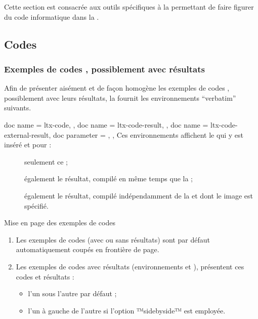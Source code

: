 \documentclass{letgut}
\begin{document}
Cette section est consacrée aux outils spécifiques à la  permettant
de faire figurer du code informatique dans la .

\subsection{Codes }
\label{sec:exemples-de-codes}

\subsubsection{Exemples de codes , possiblement avec résultats}
\label{sec:listings-}

Afin de présenter aisément et de façon homogène les exemples de codes
, possiblement avec leurs résultats, la  fournit les
environnements \enquote{verbatim} suivants.

\begin{docEnvironments}[
  doc parameter = \oarg{options},
  doclang/environment content = code,
  ]{
    {
      doc name = ltx-code,
    },
    {
      doc name = ltx-code-result,
    },
    {
      doc name = ltx-code-external-result,
      doc parameter = ,
    },
  }
  Ces environnements affichent le   qui y est inséré et
  pour :
  \begin{description}
  \item[] seulement ce  ;
  \item[] également le résultat, compilé en même temps
    que la  ;
  \item[] également le résultat, compilé
    indépendamment de la  et dont le  image est spécifié.
  \end{description}
\end{docEnvironments}

\begin{dbremark}{Mise en page des exemples de codes}{}
  \begin{enumerate}
  \item Les exemples de codes (avec ou sans résultats) sont par défaut
    automatiquement coupés en frontière de page.
  \item Les exemples de codes avec résultats (environnements
     et ), présentent
    ces codes et résultats :
    \begin{itemize}
    \item l'un sous l'autre par défaut ;
    \item l'un à gauche de l'autre si l'option ™sidebyside™ est
      employée.
    \end{itemize}
  \end{enumerate}
\end{dbremark}
\end{document}
